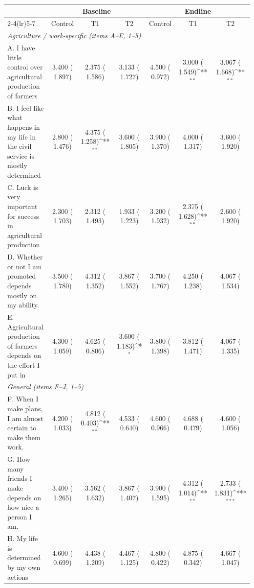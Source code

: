 \def\sym#1{\ifmmode^{#1}\else\(^{#1}\)\fi}
\begin{tabular}{lcccccc}
\toprule
 & \multicolumn{3}{c}{Baseline} & \multicolumn{3}{c}{Endline} \\
\cmidrule(lr){2-4}\cmidrule(lr){5-7}
 & Control & T1 & T2 & Control & T1 & T2 \\
\midrule
\multicolumn{7}{l}{\textit{Agriculture / work-specific (items A--E, 1--5)}}\\
A. I have little control over agricultural production of farmers &     3.400 (    1.897) &     2.375 (    1.586) &     3.133 (    1.727) &     4.500 (    0.972) &     3.000 (    1.549)\sym{**} &     3.067 (    1.668)\sym{**} \\
B. I feel like what happens in my life in the civil service is mostly determined &     2.800 (    1.476) &     4.375 (    1.258)\sym{**} &     3.600 (    1.805) &     3.900 (    1.370) &     4.000 (    1.317) &     3.600 (    1.920) \\
C. Luck is very important for success in agricultural production &     2.300 (    1.703) &     2.312 (    1.493) &     1.933 (    1.223) &     3.200 (    1.932) &     2.375 (    1.628)\sym{**} &     2.600 (    1.920) \\
D. Whether or not I am promoted depends mostly on my ability. &     3.500 (    1.780) &     4.312 (    1.352) &     3.867 (    1.552) &     3.700 (    1.767) &     4.250 (    1.238) &     4.067 (    1.534) \\
E. Agricultural production of farmers depends on the effort I put in &     4.300 (    1.059) &     4.625 (    0.806) &     3.600 (    1.183)\sym{*} &     3.800 (    1.398) &     3.812 (    1.471) &     4.067 (    1.335) \\
\multicolumn{7}{l}{\textit{General (items F--J, 1--5)}}\\
F. When I make plans, I am almost certain to make them work. &     4.200 (    1.033) &     4.812 (    0.403)\sym{**} &     4.533 (    0.640) &     4.600 (    0.966) &     4.688 (    0.479) &     4.600 (    1.056) \\
G. How many friends I make depends on how nice a person I am. &     3.400 (    1.265) &     3.562 (    1.632) &     3.867 (    1.407) &     3.900 (    1.595) &     4.312 (    1.014)\sym{**} &     2.733 (    1.831)\sym{***} \\
H. My life is determined by my own actions &     4.600 (    0.699) &     4.438 (    1.209) &     4.467 (    1.125) &     4.800 (    0.422) &     4.875 (    0.342) &     4.667 (    1.047) \\

\end{tabular}
